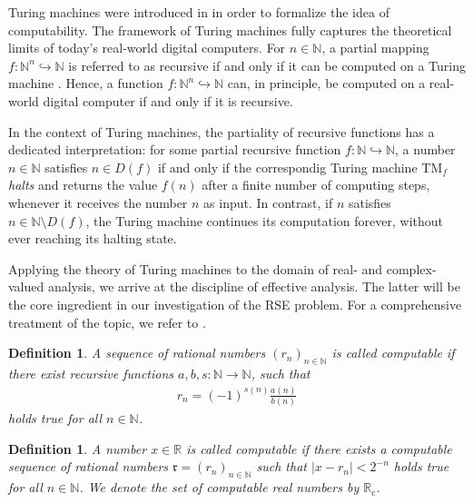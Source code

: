 \documentclass[conference]{IEEEtran}
\newcommand{\part}{\hookrightarrow}
\def\NN{{\mathbb N}}
\def\RR{{\mathbb R}}
\newcommand{\RRc}{\RR_{\mathrm{c}}}
\newcommand{\TM}{\mathrm{TM}}
\newtheorem{Definition}[Theorem]{Definition}
\begin{document}
	Turing machines were introduced in \cite{T37a,T38} in order to formalize the idea of computability. 
	The framework of Turing machines fully captures the theoretical limits of today's real-world digital computers. For \(n\in\NN\), a partial mapping \(f : \NN^n \part \NN\) 
	is referred to as recursive if and only if it can be computed on a Turing machine \cite{Kl36,T37b}. Hence, a function \(f :\NN^n \part \NN\) can, in principle, be 
	computed on a real-world digital computer if and only if it is recursive. 
	
	In the context of Turing machines, the partiality of recursive functions has a dedicated interpretation: for some partial recursive function \(f: \NN \part \NN\), 
	a number \(n\in\NN\) satisfies \(n\in D(f)\) if and only if the correspondig Turing machine \(\TM_f\) \emph{halts} and returns the value \(f(n)\) after a finite
	number of computing steps, whenever it receives the number \(n\) as input. In contrast, if \(n\) satisfies \(n\in \NN\setminus D(f)\), the Turing machine continues
	its computation forever, without ever reaching its halting state. 

	Applying the theory of Turing machines to the domain of real- and complex-valued analysis, we arrive at the 
	discipline of effective analysis. The latter will be the core ingredient in our investigation of the RSE problem. 
	For a comprehensive treatment of the topic, we refer to \cite{PoRi17,AB14}.%

	\begin{Definition}  \label{ber}
						A sequence of rational numbers \((r_n)_{n\in\NN}\) is called computable if there exist recursive functions \(a,b,s:\NN\to\NN\), such that
						\begin{align*}   r_{n} = (-1)^{s(n)}\frac{a(n)}{b(n)} 
						\end{align*} 
						holds true for all \(n\in\NN\).
	\end{Definition}

	\begin{Definition}  \label{compreal}
						A number \(x\in\RR\) is called computable if there exists a computable sequence of rational numbers 
						\(\mathfrak{r} = (r_n)_{n\in\NN}\) such that \(|x-r_n|<2^{-n}\) holds true for all \(n\in\NN\). We denote the set of computable real numbers by \(\RRc\).
	\end{Definition}
\end{document}
